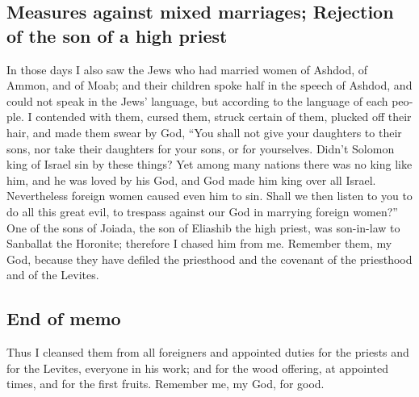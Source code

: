 \begin{paracol}{2}
\begin{otherlanguage}{english}
\hypertarget{measures-against-mixed-marriages-rejection-of-the-son-of-a-high-priest}{%
\subsection{Measures against mixed marriages; Rejection of the son of a
high
priest}\label{measures-against-mixed-marriages-rejection-of-the-son-of-a-high-priest}}

 In those days I also saw the Jews who had married women
of Ashdod, of Ammon, and of Moab;  and their children
spoke half in the speech of Ashdod, and could not speak in the Jews'
language, but according to the language of each people. 
I contended with them, cursed them, struck certain of them, plucked off
their hair, and made them swear by God, ``You shall not give your
daughters to their sons, nor take their daughters for your sons, or for
yourselves.  Didn't Solomon king of Israel sin by these
things? Yet among many nations there was no king like him, and he was
loved by his God, and God made him king over all Israel. Nevertheless
foreign women caused even him to sin.  Shall we then
listen to you to do all this great evil, to trespass against our God in
marrying foreign women?''  One of the sons of Joiada, the
son of Eliashib the high priest, was son-in-law to Sanballat the
Horonite; therefore I chased him from me.  Remember them,
my God, because they have defiled the priesthood and the covenant of the
priesthood and of the Levites.

\hypertarget{end-of-memo}{%
\subsection{End of memo}\label{end-of-memo}}

 Thus I cleansed them from all foreigners and appointed
duties for the priests and for the Levites, everyone in his work;
 and for the wood offering, at appointed times, and for
the first fruits. Remember me, my God, for good.
\end{otherlanguage} \end{paracol}
